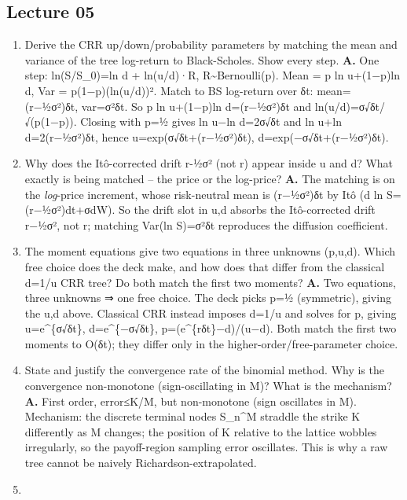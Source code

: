 \documentclass[
  11pt,
]{article}
\providecommand{\tightlist}{%
  \setlength{\itemsep}{0pt}\setlength{\parskip}{0pt}}
\begin{document}
\hypertarget{lecture-05}{%
\subsection{Lecture 05}\label{lecture-05}}

\begin{enumerate}
\def\labelenumi{\arabic{enumi}.}
\tightlist
\item
  Derive the CRR up/down/probability parameters by matching the mean and
  variance of the tree log-return to Black-Scholes. Show every step.
  \textbf{A.} One step: ln(S/S\_0)=ln d + ln(u/d)·R,
  R\textasciitilde Bernoulli(p). Mean = p ln u+(1−p)ln d, Var =
  p(1−p)(ln(u/d))². Match to BS log-return over δt: mean=(r−½σ²)δt,
  var=σ²δt. So p ln u+(1−p)ln d=(r−½σ²)δt and ln(u/d)=σ√δt/√(p(1−p)).
  Closing with p=½ gives ln u−ln d=2σ√δt and ln u+ln d=2(r−½σ²)δt, hence
  u=exp(σ√δt+(r−½σ²)δt), d=exp(−σ√δt+(r−½σ²)δt).
\item
  Why does the Itô-corrected drift r-½σ² (not r) appear inside u and d?
  What exactly is being matched -- the price or the log-price?
  \textbf{A.} The matching is on the \emph{log}-price increment, whose
  risk-neutral mean is (r−½σ²)δt by Itô (d ln S=(r−½σ²)dt+σdW). So the
  drift slot in u,d absorbs the Itô-corrected drift r−½σ², not r;
  matching Var(ln S)=σ²δt reproduces the diffusion coefficient.
\item
  The moment equations give two equations in three unknowns (p,u,d).
  Which free choice does the deck make, and how does that differ from
  the classical d=1/u CRR tree? Do both match the first two moments?
  \textbf{A.} Two equations, three unknowns ⇒ one free choice. The deck
  picks p=½ (symmetric), giving the u,d above. Classical CRR instead
  imposes d=1/u and solves for p, giving u=e\^{}\{σ√δt\},
  d=e\^{}\{−σ√δt\}, p=(e\^{}\{rδt\}−d)/(u−d). Both match the first two
  moments to O(δt); they differ only in the higher-order/free-parameter
  choice.
\item
  State and justify the convergence rate of the binomial method. Why is
  the convergence non-monotone (sign-oscillating in M)? What is the
  mechanism? \textbf{A.} First order, \textbar error\textbar≤K/M, but
  non-monotone (sign oscillates in M). Mechanism: the discrete terminal
  nodes S\_n\^{}M straddle the strike K differently as M changes; the
  position of K relative to the lattice wobbles irregularly, so the
  payoff-region sampling error oscillates. This is why a raw tree cannot
  be naively Richardson-extrapolated.
\item

\end{enumerate}
\end{document}
